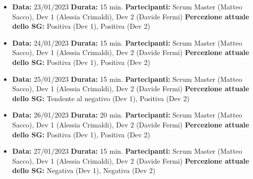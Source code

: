 \documentclass{article}
\begin{document}
    \begin{itemize}
        \item \textbf{Data:} 23/01/2023
        \newline \textbf{Durata:} 15 min.
        \newline \textbf{Partecipanti:} Scrum Master (Matteo Sacco), Dev 1 (Alessia Crimaldi), Dev 2 (Davide Fermi)
        \newline \textbf{Percezione attuale dello SG:} Positiva (Dev 1), Positiva (Dev 2)
    \end{itemize}
    \begin{itemize}
        \item \textbf{Data:} 24/01/2023
        \newline \textbf{Durata:} 15 min.
        \newline \textbf{Partecipanti:} Scrum Master (Matteo Sacco), Dev 1 (Alessia Crimaldi), Dev 2 (Davide Fermi)
        \newline \textbf{Percezione attuale dello SG:} Positiva (Dev 1), Positiva (Dev 2)
    \end{itemize}
    \begin{itemize}
        \item \textbf{Data:} 25/01/2023
        \newline \textbf{Durata:} 15 min.
        \newline \textbf{Partecipanti:} Scrum Master (Matteo Sacco), Dev 1 (Alessia Crimaldi), Dev 2 (Davide Fermi)
        \newline \textbf{Percezione attuale dello SG:} Tendente al negativo (Dev 1), Positiva (Dev 2)
    \end{itemize}
    \begin{itemize}
        \item \textbf{Data:} 26/01/2023
        \newline \textbf{Durata:} 20 min.
        \newline \textbf{Partecipanti:} Scrum Master (Matteo Sacco), Dev 1 (Alessia Crimaldi), Dev 2 (Davide Fermi)
        \newline \textbf{Percezione attuale dello SG:} Positiva (Dev 1), Positiva (Dev 2)
    \end{itemize}
    \begin{itemize}
        \item \textbf{Data:} 27/01/2023
        \newline \textbf{Durata:} 15 min.
        \newline \textbf{Partecipanti:} Scrum Master (Matteo Sacco), Dev 1 (Alessia Crimaldi), Dev 2 (Davide Fermi)
        \newline \textbf{Percezione attuale dello SG:} Negativa (Dev 1), Negativa (Dev 2)
    \end{itemize}
\end{document}
